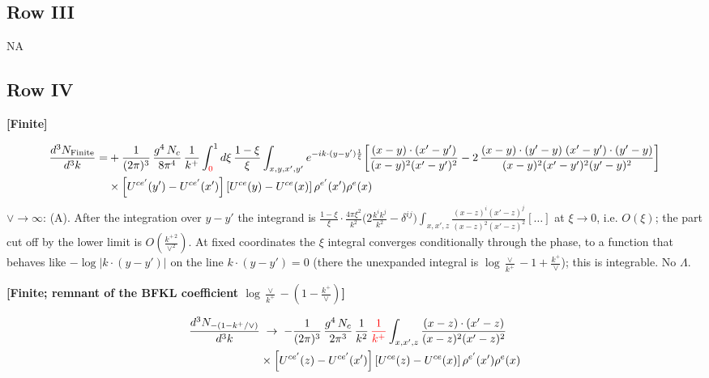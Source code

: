 \documentclass[9pt]{article}
\numberwithin{equation}{section}
\begin{document}
\subsection{Row III}
\textsc{NA}
\subsection{Row IV}
\par\smallskip\noindent\textbf{[Finite]}\par\nobreak
\begin{align}
\frac{d^{3}N_{\rm Finite}}{d^{3}k}= &  +\frac{1}{(2\pi)^{3}}\,\frac{g^{4}\,N_{c}}{8\pi^{4}}\,\frac{1}{k^{+}}\int_{{\color{red}0}}^{1}d\xi\,\frac{1-\xi}{\xi}\int_{x,y,x',y'}e^{-ik\cdot(y-y')\frac{1}{\xi}}\bigg[\frac{(x-y)\cdot(x'-y')}{(x-y)^{2}(x'-y')^{2}}-2\,\frac{(x-y)\cdot(y'-y)\;(x'-y')\cdot(y'-y)}{(x-y)^{2}(x'-y')^{2}(y'-y)^{2}}\bigg]\notag\\
&\times\left[U^{ce'}(y') - U^{ce'}(x')\right]\left[U^{ce}(y) - U^{ce}(x)\right]\rho^{e'}(x')\rho^{e}(x)
\end{align}
\noindent $\vee\to\infty$: (A). After the integration over $y-y'$ the integrand is $\frac{1-\xi}{\xi}\cdot\frac{4\pi\xi^{2}}{k^{2}}\big(2\frac{k^{i}k^{j}}{k^{2}}-\delta^{ij}\big)\int_{x,x',z}\frac{(x-z)^{i}(x'-z)^{j}}{(x-z)^{2}(x'-z)^{2}}[\dots]$ at $\xi\to0$, i.e. $O(\xi)$; the part cut off by the lower limit is $O(\frac{k^{+\,2}}{\vee^{2}})$. At fixed coordinates the $\xi$ integral converges conditionally through the phase, to a function that behaves like $-\log|k\cdot(y-y')|$ on the line $k\cdot(y-y')=0$ (there the unexpanded integral is $\log\frac{\vee}{k^{+}}-1+\frac{k^{+}}{\vee}$); this is integrable. No $\Lambda$.
\par\smallskip\noindent\textbf{[Finite; remnant of the BFKL coefficient $\log\frac{\vee}{k^{+}}-(1-\frac{k^{+}}{\vee})$]}\par\nobreak
\begin{align}
\frac{d^{3}N_{-(1-k^{+}/\vee)}}{d^{3}k} & \;\to\; -\frac{1}{(2\pi)^{3}}\,\frac{g^{4}\,N_{c}}{2\pi^{3}}\,\frac{1}{k^{2}}\,{\color{red}\frac{1}{k^{+}}}\int_{x,x',z}\frac{(x-z)\cdot(x'-z)}{(x-z)^{2}(x'-z)^{2}}\notag \\ & \times\left[U^{ce'}(z) - U^{ce'}(x')\right]\left[U^{ce}(z) - U^{ce}(x)\right]\rho^{e'}(x')\rho^{e}(x)
\end{align}
\par{}\par\medskip
\end{document}
